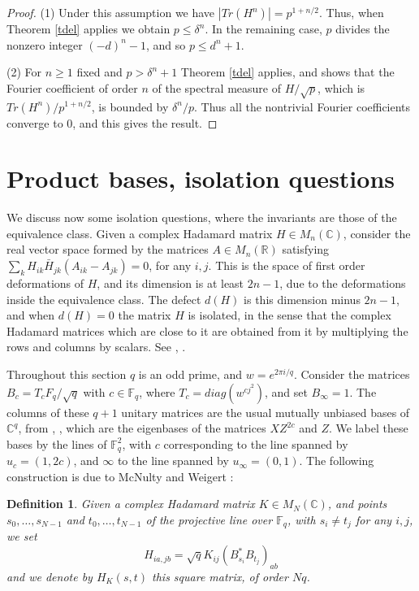 \documentclass[11pt]{amsart}
\newtheorem{definition}[theorem]{Definition}
\theoremstyle{definition}
\begin{document}
\begin{proof}
(1) Under this assumption we have $|Tr(H^n)|=p^{1+n/2}$. Thus, when Theorem \ref{tdel} applies we obtain $p\leq\delta^n$. In the remaining case, $p$ divides the nonzero integer $(-d)^n-1$, and so $p\leq d^n+1$.

\medskip

(2) For $n\geq1$ fixed and $p>\delta^n+1$ Theorem \ref{tdel} applies, and shows that the Fourier coefficient of order $n$ of the spectral measure of $H/\sqrt{p}$, which is $Tr(H^n)/p^{1+n/2}$, is bounded by $\delta^n/p$. Thus all the nontrivial Fourier coefficients converge to 0, and this gives the result.
\end{proof}

\section{Product bases, isolation questions}

We discuss now some isolation questions, where the invariants are those of the equivalence class. Given a complex Hadamard matrix $H\in M_n(\mathbb C)$, consider the real vector space formed by the matrices $A\in M_n(\mathbb R)$ satisfying $\sum_kH_{ik}\bar{H}_{jk}(A_{ik}-A_{jk})=0$, for any $i,j$. This is the space of first order deformations of $H$, and its dimension is at least $2n-1$, due to the deformations inside the equivalence class. The defect $d(H)$ is this dimension minus $2n-1$, and when $d(H)=0$ the matrix $H$ is isolated, in the sense that the complex Hadamard matrices which are close to it are obtained from it by multiplying the rows and columns by scalars. See \cite{tzy}, \cite{tz2}.

\medskip

Throughout this section $q$ is an odd prime, and $w=e^{2\pi i/q}$. Consider the matrices $B_c=T_cF_q/\sqrt{q}$ with $c\in\mathbb F_q$, where $T_c=diag(w^{cj^2})$, and set $B_\infty=1$. The columns of these $q+1$ unitary matrices are the usual mutually unbiased bases of $\mathbb C^q$, from \cite{iva}, \cite{wfi}, which are the eigenbases of the matrices $XZ^{2c}$ and $Z$. We label these bases by the lines of $\mathbb F_q^2$, with $c$ corresponding to the line spanned by $u_c=(1,2c)$, and $\infty$ to the line spanned by $u_\infty=(0,1)$. The following construction is due to McNulty and Weigert \cite{mwi}:

\begin{definition}\label{dmw}
Given a complex Hadamard matrix $K\in M_N(\mathbb C)$, and points $s_0,\ldots,s_{N-1}$ and $t_0,\ldots,t_{N-1}$ of the projective line over $\mathbb F_q$, with $s_i\neq t_j$ for any $i,j$, we set
$$H_{ia,jb}=\sqrt{q}K_{ij}(B_{s_i}^*B_{t_j})_{ab}$$
and we denote by $H_K(s,t)$ this square matrix, of order $Nq$.
\end{definition}
\end{document}
